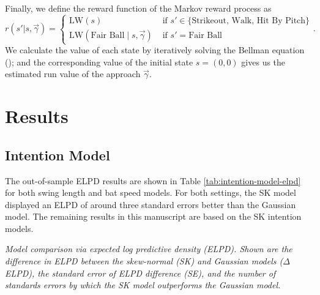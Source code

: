 \documentclass{article}
\begin{document}
      Finally, we define the reward function of the Markov reward process as
      \begin{equation*}
          r(s' | s, \vec\gamma) = \begin{cases}
            \mbox{LW}(s) & \mbox{ if } s' \in \{\mbox{Strikeout, Walk, Hit By Pitch}\}\\
            \mbox{LW}(\mbox{Fair Ball} \mid s, \vec\gamma) & \mbox{ if } s' = \mbox{Fair Ball}
          \end{cases}.
      \end{equation*}
      We calculate the value of each state by iteratively solving the Bellman equation (\cite{bellman_dynamic_1957}); and the corresponding value of the initial state $s = (0, 0)$ gives us the estimated run value of the approach $\vec\gamma$.

  \section{Results}
  \label{sec:results}
  

    \subsection{Intention Model}
    \label{sec:results-intention}

      The out-of-sample ELPD results are shown in Table \ref{tab:intention-model-elpd} for both swing length and bat speed models. For both settings, the SK model displayed an ELPD of around three standard errors better than the Gaussian model. The remaining results in this manuscript are based on the SK intention models.

      \begin{table}[H]
        \centering
        
        \caption{\it Model comparison via expected log predictive density (ELPD). Shown are the difference in ELPD between the skew-normal (SK) and Gaussian models ($\Delta$ELPD), the standard error of ELPD difference (SE), and the number of standards errors by which the SK model outperforms the Gaussian model.}
        \label{tab:intention-model-elpd}
      \end{table}
\end{document}
